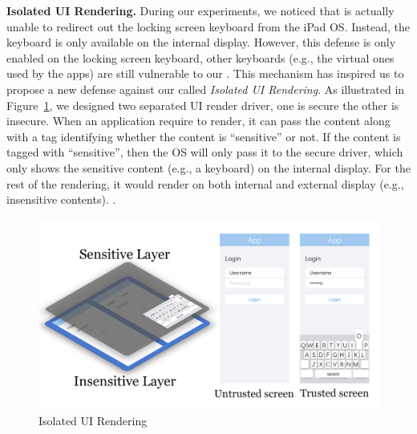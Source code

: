 \textbf{Isolated UI Rendering.} During our experiments, we noticed that \tool
is actually unable to redirect out the locking screen keyboard from the iPad
OS. Instead, the keyboard is only available on the internal display. However,
this defense is only enabled on the locking screen keyboard, other keyboards
(e.g., the virtual ones used by the apps) are still vulnerable to our \tool.
This mechanism has inspired us to propose a new defense against our \tool
called \emph{Isolated UI Rendering}. As illustrated in
Figure~\ref{fig:isolated_ui}, we designed two separated UI render driver, one
is secure the other is insecure. When an application require to render, it can
pass the content along with a tag identifying whether the content is
``sensitive'' or not. If the content is tagged with ``sensitive'', then the OS
will only pass it to the secure driver, which only shows the sensitive content
(e.g., a keyboard) on the internal display. For the rest of the rendering, it
would render on both internal and external display (e.g., insensitive
contents). .

\begin{figure}[t]
	\centering
	\includegraphics[width=\linewidth]{./Figs/isolated_ui.png}
	\caption{Isolated UI Rendering}%
	\label{fig:isolated_ui}
\end{figure}
